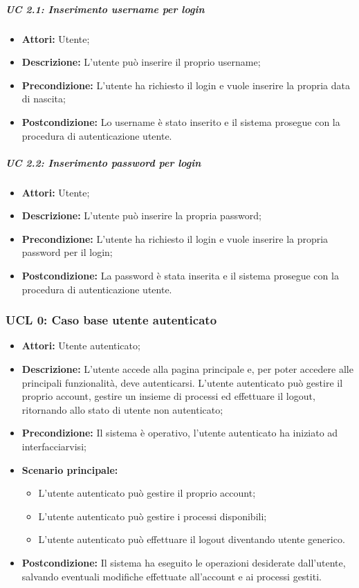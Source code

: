 \subparagraph{UC 2.1: Inserimento username per login}
\begin{itemize}
\item \textbf{Attori:} Utente;
\item \textbf{Descrizione:} L'utente può inserire il proprio username;
\item \textbf{Precondizione:} L'utente ha richiesto il login e vuole inserire la propria data di nascita;
\item \textbf{Postcondizione:} Lo username è stato inserito e il sistema prosegue con la procedura di autenticazione utente.
\end{itemize}

\subparagraph{UC 2.2: Inserimento password per login}
\begin{itemize}
\item \textbf{Attori:} Utente;
\item \textbf{Descrizione:} L'utente può inserire la propria password;
\item \textbf{Precondizione:} L'utente ha richiesto il login e vuole inserire la propria password per il login;
\item \textbf{Postcondizione:} La password è stata inserita e il sistema prosegue con la procedura di autenticazione utente.
\end{itemize}

\subsubsection{UCL 0: Caso base utente autenticato}

\begin{itemize}
\item \textbf{Attori:} Utente autenticato;
\item \textbf{Descrizione:} L'utente accede alla pagina principale e, per poter accedere alle principali funzionalità, deve autenticarsi.
L'utente autenticato può gestire il proprio account, gestire un insieme di processi ed effettuare il logout, ritornando allo stato di utente non autenticato;
\item \textbf{Precondizione:} Il sistema è operativo, l'utente autenticato ha iniziato ad interfacciarvisi;
\item \textbf{Scenario principale:}
\begin{itemize}
\item L'utente autenticato può gestire il proprio account;
\item L'utente autenticato può gestire i processi disponibili;
\item L'utente autenticato può effettuare il logout diventando utente generico.
\end{itemize}
\item \textbf{Postcondizione:} Il sistema ha eseguito le operazioni desiderate dall'utente, salvando eventuali modifiche effettuate all'account e ai processi gestiti.
\end{itemize}

